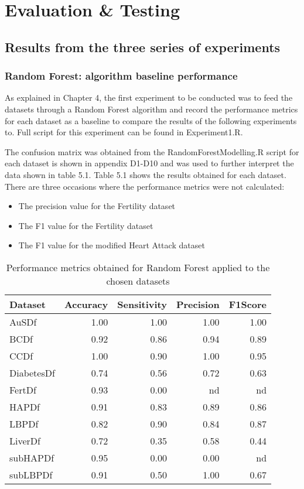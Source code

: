 \chapter{Evaluation \& Testing}\label{ch:Evaluation}
\section{Results from the three series of experiments}
\subsection{Random Forest: algorithm baseline performance}
As explained in Chapter 4, the first experiment to be conducted was to feed the datasets through  a Random Forest algorithm and record the performance metrics for each dataset as a baseline to compare the results of the following experiments to. Full script for this experiment can be found in Experiment1.R.

The confusion matrix was obtained from the RandomForestModelling.R script for each dataset is shown in appendix D1-D10 and was used to further interpret the data shown in table 5.1.\newline
Table 5.1 shows the results obtained for each dataset. There are three occasions where the performance metrics were not calculated:
\begin{itemize}
    \item The precision value for the Fertility dataset
    \item The F1 value for the Fertility dataset
    \item The F1 value for the modified Heart Attack dataset
\end{itemize}

\begin{table}[!htbp]
\centering
\begin{tabular}{lrrrr}
  \hline
  \rowcolor{LightCyan}
Dataset & Accuracy & Sensitivity & Precision & F1Score \\ 
  \hline
AuSDf & 1.00 & 1.00 & 1.00 & 1.00 \\ 
  BCDf & 0.92 & 0.86 & 0.94 & 0.89 \\ 
  CCDf & 1.00 & 0.90 & 1.00 & 0.95 \\ 
  DiabetesDf & 0.74 & 0.56 & 0.72 & 0.63 \\ 
  FertDf & 0.93 & 0.00 & nd & nd \\ 
  HAPDf & 0.91 & 0.83 & 0.89 & 0.86 \\ 
  LBPDf & 0.82 & 0.90 & 0.84 & 0.87 \\ 
  LiverDf & 0.72 & 0.35 & 0.58 & 0.44 \\ 
  subHAPDf & 0.95 & 0.00 & 0.00 & nd \\ 
  subLBPDf & 0.91 & 0.50 & 1.00 & 0.67 \\ 
   \hline
\end{tabular}
\caption{Performance metrics obtained for Random Forest applied to the chosen datasets}
\end{table}


